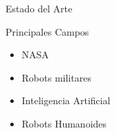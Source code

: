 
\begin{frame}[fragile]{Estado del Arte}
\vspace{10px}
\pause
{}
\begin{block}{Principales Campos}
	\begin{itemize}
		\item NASA
		\pause
		\item Robots militares
		\pause
		\item Inteligencia Artificial
		\pause
		\item Robots Humanoides
	\end{itemize}
\end{block}
\end{frame}



